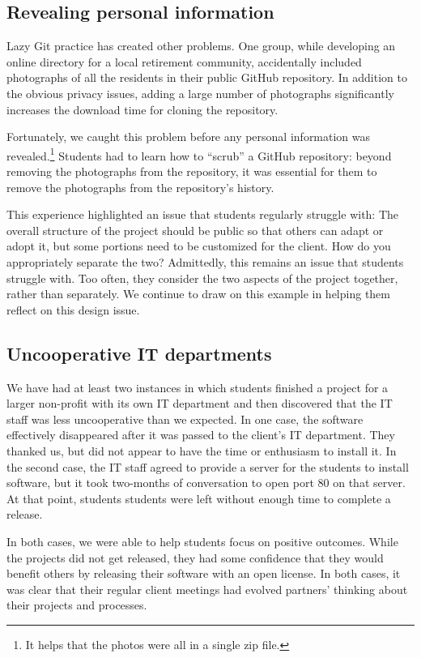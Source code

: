\subsection{Revealing personal information}

Lazy Git practice has created other problems.  One group, while
developing an online directory for a local retirement community,
accidentally included photographs of all the residents in their
public GitHub repository.  In addition to the obvious privacy issues,
adding a large number of photographs significantly increases
the download time for cloning the repository.

Fortunately, we caught this problem before any personal information
was revealed.\footnote{It helps that the photos were all in a single
zip file.}  Students had to learn how to ``scrub'' a GitHub repository:
beyond removing the photographs from the repository, it was essential
for them to remove the photographs from the repository's history.

This experience highlighted an issue that students regularly struggle
with: The overall structure of the project should be public so that
others can adapt or adopt it, but some portions need to be customized
for the client.  How do you appropriately separate the two?
Admittedly, this remains an issue that students struggle with. Too
often, they consider the two aspects of the project together, rather
than separately.  We continue to draw on this example in helping them
reflect on this design issue.

\subsection{Uncooperative IT departments}

We have
had at least two instances in which students finished a project for
a larger non-profit with its own IT department and then discovered
that the IT staff was less uncooperative than we expected.  In one
case, the software effectively disappeared after it was passed to
the client's IT department.  They thanked us, but did not appear
to have the time or enthusiasm to install it.  In the second case,
the IT staff agreed to provide a server for the students to install
software, but it took two-months of conversation to open port 80 on
that server.  At that point, students students were left without enough
time to complete a release.

In both cases, we were able to help students focus on positive
outcomes.  While the projects did not get released, they had some
confidence that they would benefit others by releasing their software
with an open license. In both cases, it was clear that their
regular client meetings had evolved partners' thinking about their
projects and processes.

